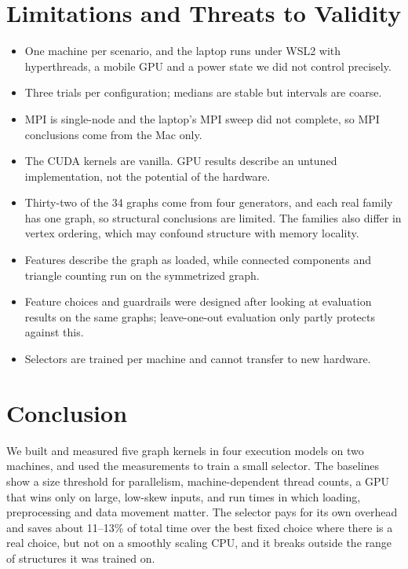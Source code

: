 \documentclass[conference]{IEEEtran}
\begin{document}
\section{Limitations and Threats to Validity}
\begin{itemize}
\item One machine per scenario, and the laptop runs under WSL2 with hyperthreads, a mobile GPU and a power state we did not control precisely.
\item Three trials per configuration; medians are stable but intervals are coarse.
\item MPI is single-node and the laptop's MPI sweep did not complete, so MPI conclusions come from the Mac only.
\item The CUDA kernels are vanilla. GPU results describe an untuned implementation, not the potential of the hardware.
\item Thirty-two of the 34 graphs come from four generators, and each real family has one graph, so structural conclusions are limited. The families also differ in vertex ordering, which may confound structure with memory locality.
\item Features describe the graph as loaded, while connected components and triangle counting run on the symmetrized graph.
\item Feature choices and guardrails were designed after looking at evaluation results on the same graphs; leave-one-out evaluation only partly protects against this.
\item Selectors are trained per machine and cannot transfer to new hardware.
\end{itemize}

\section{Conclusion}
We built and measured five graph kernels in four execution models on two machines, and used the measurements to train a small selector. The baselines show a size threshold for parallelism, machine-dependent thread counts, a GPU that wins only on large, low-skew inputs, and run times in which loading, preprocessing and data movement matter. The selector pays for its own overhead and saves about 11--13\% of total time over the best fixed choice where there is a real choice, but not on a smoothly scaling CPU, and it breaks outside the range of structures it was trained on.

\end{document}
